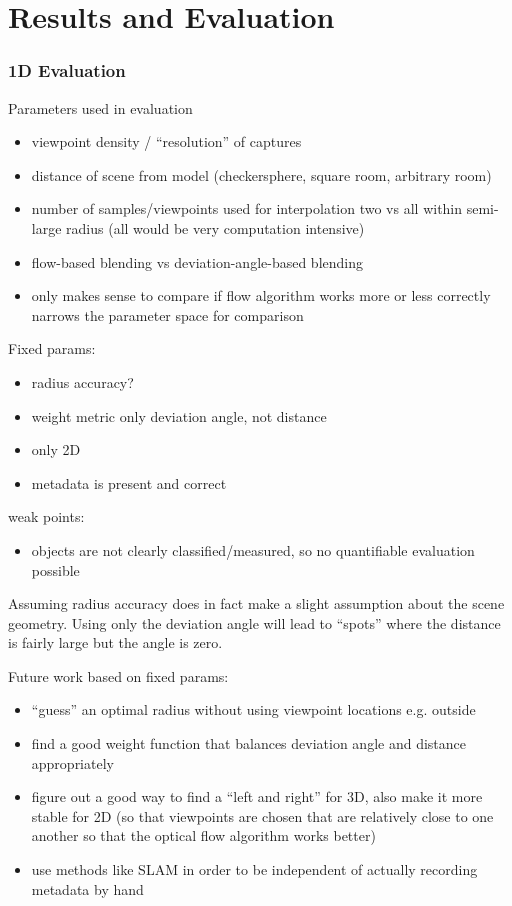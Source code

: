 \chapter{Results and Evaluation}

\subsection{1D Evaluation \label{evaluation1D}}

Parameters used in evaluation
\begin{itemize}
  \item viewpoint density / ``resolution'' of captures
  \item distance of scene from model (checkersphere, square room, arbitrary room)
  \item number of samples/viewpoints used for interpolation \ar two vs all within semi-large radius (all would be very computation intensive)
  \item flow-based blending vs deviation-angle-based blending
  \item only makes sense to compare if flow algorithm works more or less correctly \ar narrows the parameter space for comparison
\end{itemize}

Fixed params:
\begin{itemize}
  \item radius accuracy?
  \item weight metric only deviation angle, not distance
  \item only 2D
  \item metadata is present and correct
\end{itemize}

weak points:
\begin{itemize}
  \item objects are not clearly classified/measured, so no quantifiable evaluation possible
\end{itemize}

Assuming radius accuracy does in fact make a slight assumption about the scene geometry. Using only the deviation angle will lead to ``spots'' where the distance is fairly large but the angle is zero. 

Future work based on fixed params:
\begin{itemize}
  \item ``guess'' an optimal radius without using viewpoint locations e.g. outside
  \item find a good weight function that balances deviation angle and distance appropriately
  \item figure out a good way to find a ``left and right'' for 3D, also make it more stable for 2D (so that viewpoints are chosen that are relatively close to one another so that the optical flow algorithm works better)
  \item use methods like SLAM in order to be independent of actually recording metadata by hand
\end{itemize}


